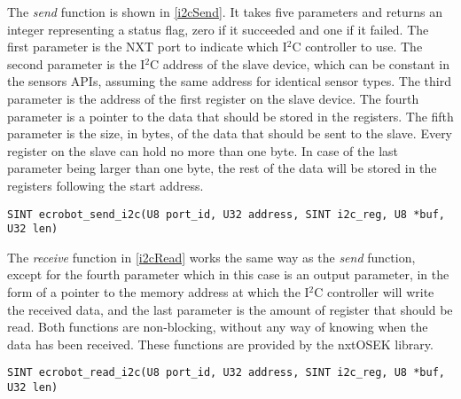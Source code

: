  
The \emph{send} function is shown in \cref{i2cSend}. It takes five parameters and returns an integer representing a status flag, zero if it succeeded and one if it failed. The first parameter is the NXT port to indicate which I$^2$C controller to use. The second parameter is the I$^2$C address of the slave device, which can be constant in the sensors APIs, assuming the same address for identical sensor types. The third parameter is the address of the first register on the slave device. The fourth parameter is a pointer to the data that should be stored in the registers. The fifth parameter is the size, in bytes, of the data that should be sent to the slave. Every register on the slave can hold no more than one byte. In case of the last parameter being larger than one byte, the rest of the data will be stored in the registers following the start address.

\begin{lstlisting}[style=customc, label={i2cSend}, caption={Sending data over I$^2$C}]
SINT ecrobot_send_i2c(U8 port_id, U32 address, SINT i2c_reg, U8 *buf, U32 len)
\end{lstlisting}

The \emph{receive} function in \cref{i2cRead} works the same way as the \emph{send} function, except for the fourth parameter which in this case is an output parameter, in the form of a pointer to the memory address at which the I$^2$C controller will write the received data, and the last parameter is the amount of register that should be read. Both functions are non-blocking, without any way of knowing when the data has been received. These functions are provided by the nxtOSEK library.

\begin{lstlisting}[style=customc, label={i2cRead}, caption={Receiving data over I$^2$C}]
SINT ecrobot_read_i2c(U8 port_id, U32 address, SINT i2c_reg, U8 *buf, U32 len)
\end{lstlisting}



